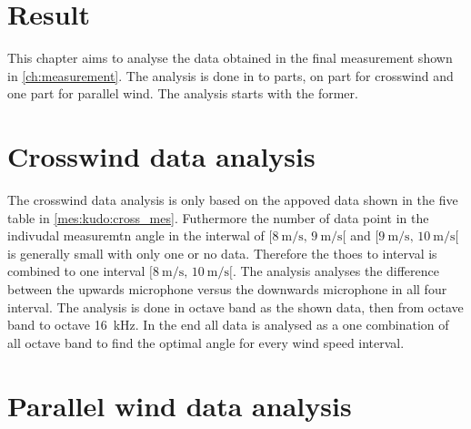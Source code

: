 \section{Result}
This chapter aims to analyse the data obtained in the final measurement shown in \autoref{ch:measurement}. The analysis is done in to parts, on part for crosswind and one part for parallel wind. The analysis starts with the former. 



\section{Crosswind data analysis}\label{res:cross_data_ana}
The crosswind data analysis is only based on the appoved data shown in the five table in \autoref{mes:kudo:cross_mes}. Futhermore the number of data point in the indivudal measuremtn angle in the interwal of $[\SI{8}{\meter\per\second},\, \SI{9}{\meter\per\second}[ $ and $[\SI{9}{\meter\per\second},\, \SI{10}{\meter\per\second}[ $ is generally small with only one or no data. Therefore the thoes to interval is combined to one interval $[\SI{8}{\meter\per\second},\, \SI{10}{\meter\per\second}[ $. The analysis analyses the difference between the upwards microphone versus the downwards microphone in all four interval. The analysis is done in octave band as the shown data, then from octave band  to octave \SI{16}{\kilo\hertz}. In the end all data is analysed as a one combination of all octave band to find the optimal angle for every wind speed interval.   




 
  
   
 



\section{Parallel wind data analysis}\label{res:par_data_ana}

  
  
